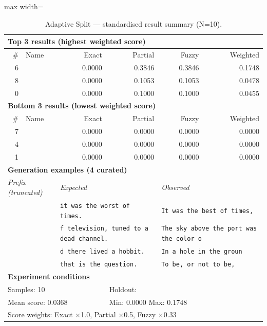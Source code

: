 \begin{table}[htbp]
\centering
\caption{Adaptive Split — standardised result summary (N=10).}
\label{tab:adaptive_split_summary}
\begin{adjustbox}{max width=\textwidth}
\begin{tabular}{r p{5cm} r r r r}
\toprule
\multicolumn{6}{l}{\textbf{Top 3 results (highest weighted score)}} \\
\midrule
\# & Name & Exact & Partial & Fuzzy & Weighted \\
\midrule
6 &  & 0.0000 & 0.3846 & 0.3846 & 0.1748 \\
8 &  & 0.0000 & 0.1053 & 0.1053 & 0.0478 \\
0 &  & 0.0000 & 0.1000 & 0.1000 & 0.0455 \\
\midrule
\multicolumn{6}{l}{\textbf{Bottom 3 results (lowest weighted score)}} \\
\midrule
\# & Name & Exact & Partial & Fuzzy & Weighted \\
\midrule
7 &  & 0.0000 & 0.0000 & 0.0000 & 0.0000 \\
4 &  & 0.0000 & 0.0000 & 0.0000 & 0.0000 \\
1 &  & 0.0000 & 0.0000 & 0.0000 & 0.0000 \\
\midrule
\multicolumn{6}{l}{\textbf{Generation examples (4 curated)}} \\
\midrule
\multicolumn{2}{l}{\textit{Prefix (truncated)}} & \multicolumn{2}{l}{\textit{Expected}} & \multicolumn{2}{l}{\textit{Observed}} \\
\midrule
\multicolumn{2}{l}{\texttt{}} & \multicolumn{2}{l}{\texttt{it was the worst of times.}} & \multicolumn{2}{l}{\texttt{It was the best of times,}} \\
\multicolumn{2}{l}{\texttt{}} & \multicolumn{2}{l}{\texttt{f television, tuned to a dead channel.}} & \multicolumn{2}{l}{\texttt{The sky above the port was the color o}} \\
\multicolumn{2}{l}{\texttt{}} & \multicolumn{2}{l}{\texttt{d there lived a hobbit.}} & \multicolumn{2}{l}{\texttt{In a hole in the groun}} \\
\multicolumn{2}{l}{\texttt{}} & \multicolumn{2}{l}{\texttt{that is the question.}} & \multicolumn{2}{l}{\texttt{To be, or not to be,}} \\
\midrule
\multicolumn{6}{l}{\textbf{Experiment conditions}} \\
\midrule
\multicolumn{3}{l}{Samples: 10} & \multicolumn{3}{l}{Holdout: } \\
\multicolumn{3}{l}{Mean score: 0.0368} & \multicolumn{3}{l}{Min: 0.0000 \quad Max: 0.1748} \\
\multicolumn{6}{l}{Score weights: Exact $\times$1.0, Partial $\times$0.5, Fuzzy $\times$0.33} \\
\bottomrule
\end{tabular}
\end{adjustbox}
\end{table}
